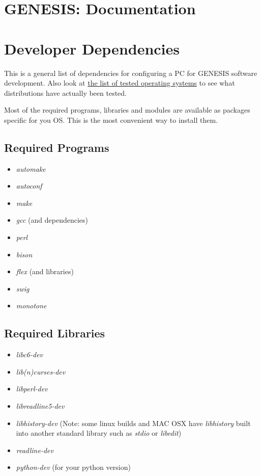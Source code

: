 \documentclass[12pt]{article}
\begin{document}
\section*{GENESIS: Documentation}

\section*{Developer Dependencies}

This is a general list of dependencies for configuring a PC for
GENESIS software development.  Also look at
\href{../tested-distributions/tested-distributions.tex}{the list of
  tested operating systems} to see what distributions have actually
been tested.

Most of the required programs, libraries and modules are available as
packages specific for you OS.  This is the most convenient way to
install them.

\subsection*{Required Programs}

\begin{itemize}
\item {\it automake}
\item {\it autoconf}
\item {\it make}
\item {\it gcc} (and dependencies)
\item {\it perl}
\item {\it bison}
\item {\it flex} (and libraries)
\item {\it swig}
\item {\it monotone}
\end{itemize} 

\subsection*{Required Libraries}

\begin{itemize}
\item {\it libc6-dev}
\item {\it lib(n)curses-dev}
\item {\it libperl-dev}
\item {\it libreadline5-dev}
\item {\it libhistory-dev} (Note: some linux builds and MAC OSX have
  {\it libhistory} built into another standard library such as {\it
    stdio} or {\it libedit})
\item {\it readline-dev}
\item {\it python-dev} (for your python version)
\end{itemize} 
\end{document}
